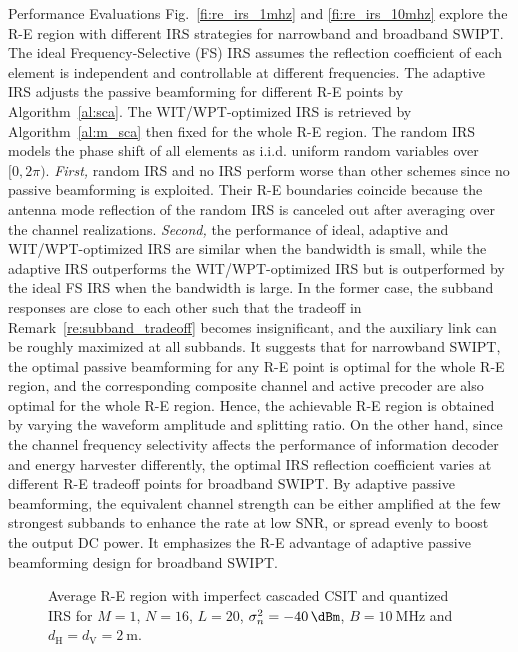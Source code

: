 \documentclass[journal]{IEEEtran}
\begin{document}
\begin{section}{Performance Evaluations}
		Fig.~\ref{fi:re_irs_1mhz} and \ref{fi:re_irs_10mhz} explore the R-E region with different IRS strategies for narrowband and broadband SWIPT. The ideal Frequency-Selective (FS) IRS assumes the reflection coefficient of each element is independent and controllable at different frequencies. The adaptive IRS adjusts the passive beamforming for different R-E points by Algorithm~\ref{al:sca}. The WIT/WPT-optimized IRS is retrieved by Algorithm~\ref{al:m_sca} then fixed for the whole R-E region. The random IRS models the phase shift of all elements as i.i.d. uniform random variables over $[0, 2\pi)$. \emph{First,} random IRS and no IRS perform worse than other schemes since no passive beamforming is exploited. Their R-E boundaries coincide because the antenna mode reflection of the random IRS is canceled out after averaging over the channel realizations. \emph{Second,} the performance of ideal, adaptive and WIT/WPT-optimized IRS are similar when the bandwidth is small, while the adaptive IRS outperforms the WIT/WPT-optimized IRS but is outperformed by the ideal FS IRS when the bandwidth is large. In the former case, the subband responses are close to each other such that the tradeoff in Remark~\ref{re:subband_tradeoff} becomes insignificant, and the auxiliary link can be roughly maximized at all subbands. It suggests that for narrowband SWIPT, the optimal passive beamforming for any R-E point is optimal for the whole R-E region, and the corresponding composite channel and active precoder are also optimal for the whole R-E region. Hence, the achievable R-E region is obtained by varying the waveform amplitude and splitting ratio. On the other hand, since the channel frequency selectivity affects the performance of information decoder and energy harvester differently, the optimal IRS reflection coefficient varies at different R-E tradeoff points for broadband SWIPT. By adaptive passive beamforming, the equivalent channel strength can be either amplified at the few strongest subbands to enhance the rate at low SNR, or spread evenly to boost the output DC power. It emphasizes the R-E advantage of adaptive passive beamforming design for broadband SWIPT.

		\begin{figure}[!t]
			\centering
			\caption{Average R-E region with imperfect cascaded CSIT and quantized IRS for $M=1$, $N=16$, $L=20$, $\sigma_n^2=\SI{-40}{\dBm}$, $B=\SI{10}{\MHz}$ and $d_{\mathrm{H}}=d_{\mathrm{V}}=\SI{2}{\meter}$.}
		\end{figure}


\end{section}
\end{document}
